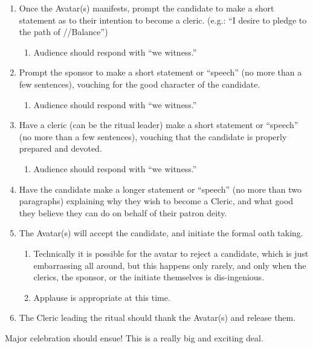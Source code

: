 \documentclass[green]{GL2020}
\begin{document}
\begin{enumerate}
\begin{enumerate}
    \end{enumerate}
    \item Once the Avatar(s) manifests, prompt the candidate to make a short statement as to their intention to become a cleric. (e.g.: ``I desire to pledge to the path of \cEbb{}/\cFlow{}/Balance'')
    \begin{enumerate}
      \item Audience should respond with ``we witness.''
    \end{enumerate}
    \item Prompt the sponsor to make a short statement or ``speech'' (no more than a few sentences), vouching for the good character of the candidate.
    \begin{enumerate}
      \item Audience should respond with ``we witness.''
    \end{enumerate}
    \item Have a cleric (can be the ritual leader) make a short statement or ``speech'' (no more than a few sentences), vouching that the candidate is properly prepared and devoted.
    \begin{enumerate}
      \item Audience should respond with ``we witness.''
    \end{enumerate}
    \item Have the candidate make a longer statement or ``speech'' (no more than two paragraphs) explaining why they wish to become a Cleric, and what good they believe they can do on behalf of their patron deity.
    \item The Avatar(s) will accept the candidate, and initiate the formal oath taking.
    \begin{enumerate}
      \item Technically it is possible for the avatar to reject a candidate, which is just embarrassing all around, but this happens only rarely, and only when the clerics, the sponsor, or the initiate themselves is dis-ingenious.
      \item Applause is appropriate at this time.
    \end{enumerate}
    \item The Cleric leading the ritual should thank the Avatar(s) and release them.
  \end{enumerate}
Major celebration should ensue! This is a really big and exciting deal.
\end{document}
